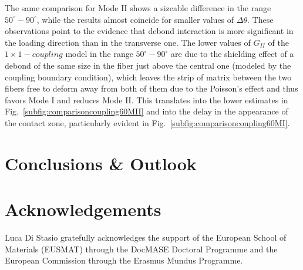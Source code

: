 \documentclass[review]{elsarticle}
\begin{document}
The same comparison for Mode II shows a sizeable difference in the range $50^{\circ}-90^{\circ}$, while the results almost coincide for smaller values of $\Delta\theta$. These observations point to the evidence that debond interaction is more significant in the loading direction than in the transverse one. The lower values of $G_{II}$ of the $1\times 1-coupling$ model in the range $50^{\circ}-90^{\circ}$ are due to the shielding effect of a debond of the same size in the fiber just above the central one (modeled by the coupling boundary condition), which leaves the strip of matrix between the two fibers free to deform away from both of them due to the Poisson’s effect and thus favors Mode I and reduces Mode II. This translates into the lower estimates in Fig.~\ref{subfig:comparisoncoupling60MII} and into the delay in the appearance of the contact zone, particularly evident in Fig.~\ref{subfig:comparisoncoupling60MI}.

\section{Conclusions \& Outlook}

\section*{Acknowledgements}

Luca Di Stasio gratefully acknowledges the support of the European School of Materials (EUSMAT) through the DocMASE Doctoral Programme and the European Commission through the Erasmus Mundus Programme.


\end{document}
